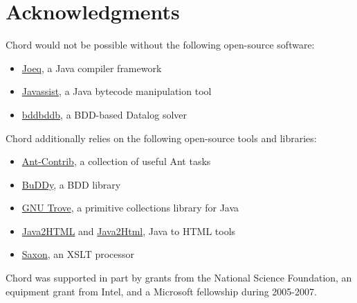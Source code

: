 \section{Acknowledgments}
\label{sec:acknowledgments}

Chord would not be possible without the following open-source software:

\begin{itemize}
\item
\href{http://joeq.sourceforge.net/}{Joeq}, a Java compiler framework
\item
\href{http://www.csg.is.titech.ac.jp/~chiba/javassist/}{Javassist},
a Java bytecode manipulation tool
\item
\href{ttp://bddbddb.sourceforge.net/}{bddbddb}, a BDD-based Datalog solver
\end{itemize}

Chord additionally relies on the following open-source tools and libraries:
\begin{itemize}
\item
\href{http://ant-contrib.sourceforge.net/}{Ant-Contrib},
a collection of useful Ant tasks  
\item
\href{http://buddy.sourceforge.net/}{BuDDy}, a BDD library
\item
\href{http://trove4j.sourceforge.net/}{GNU Trove},
a primitive collections library for Java
\item
\href{http://www.java2html.com/}{Java2HTML} and
\href{http://www.java2html.de/}{Java2Html}, Java to HTML tools
\item
\href{http://saxon.sourceforge.net/}{Saxon}, an XSLT processor
\end{itemize}

Chord was supported in part by grants from the National Science Foundation,
an equipment grant from Intel, and a Microsoft fellowship during 2005-2007.

